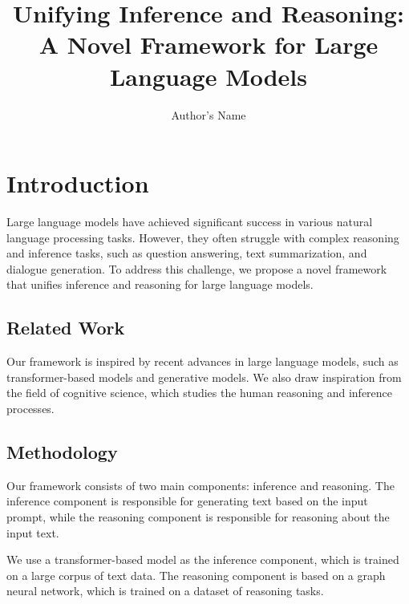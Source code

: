 \documentclass{article}
\begin{document}
\title{Unifying Inference and Reasoning: A Novel Framework for Large Language Models}

\author{Author's Name}

\maketitle


\section{Introduction}

Large language models have achieved significant success in various natural language processing tasks. However, they often struggle with complex reasoning and inference tasks, such as question answering, text summarization, and dialogue generation. To address this challenge, we propose a novel framework that unifies inference and reasoning for large language models.

\subsection{Related Work}

Our framework is inspired by recent advances in large language models, such as transformer-based models and generative models. We also draw inspiration from the field of cognitive science, which studies the human reasoning and inference processes.

\subsection{Methodology}

Our framework consists of two main components: inference and reasoning. The inference component is responsible for generating text based on the input prompt, while the reasoning component is responsible for reasoning about the input text.

We use a transformer-based model as the inference component, which is trained on a large corpus of text data. The reasoning component is based on a graph neural network, which is trained on a dataset of reasoning tasks.
\end{document}
